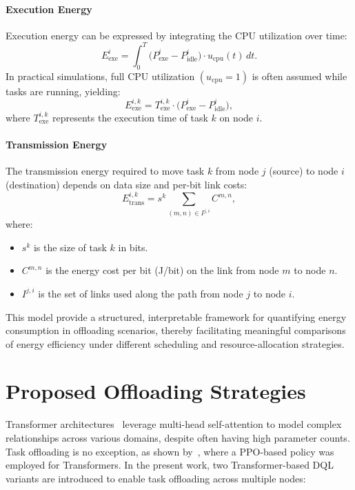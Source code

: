 \documentclass{svproc}
\begin{document}
\paragraph{Execution Energy}
Execution energy can be expressed by integrating the CPU utilization over time:
\begin{equation}
E_{\text{exe}}^{i} = \int_{0}^{T} \bigl(P_{\text{exe}}^{i} - P_{\text{idle}}^{i}\bigr) \cdot u_{\text{cpu}}(t) \, dt.
\end{equation}
In practical simulations, full CPU utilization \((u_{\text{cpu}} = 1)\) is often assumed while tasks are running, yielding:
\begin{equation}
E_{\text{exe}}^{i,k} = T_{\text{exe}}^{i,k} \cdot \bigl(P_{\text{exe}}^{i} - P_{\text{idle}}^{i}\bigr),
\end{equation}
where \(T_{\text{exe}}^{i,k}\) represents the execution time of task \(k\) on node \(i\).

\paragraph{Transmission Energy}
The transmission energy required to move task \(k\) from node \(j\) (source) to node \(i\) (destination) depends on data size and per-bit link costs:
\begin{equation}
E_{\text{trans}}^{i,k} = s^{k} \sum_{(m,n) \in I^{j,i}} C^{m,n},
\end{equation}
where:
\begin{itemize}
    \item \(s^{k}\) is the size of task \(k\) in bits.
    \item \(C^{m,n}\) is the energy cost per bit (J/bit) on the link from node \(m\) to node \(n\).
    \item \(I^{j,i}\) is the set of links used along the path from node \(j\) to node \(i\).
\end{itemize}

This model provide a structured, interpretable framework for quantifying energy consumption in offloading scenarios, thereby facilitating meaningful comparisons of energy efficiency under different scheduling and resource-allocation strategies.


\section{Proposed Offloading Strategies}\label{sec:offloading_strategy}

Transformer architectures~\citep{vaswani2023attentionneed} leverage multi-head self-attention to model complex relationships across various domains, despite often having high parameter counts. Task offloading is no exception, as shown by~\citet{gholipour_tpto_2023}, where a PPO-based policy was employed for Transformers. In the present work, two Transformer-based DQL variants are introduced to enable task offloading across multiple nodes:
\end{document}
